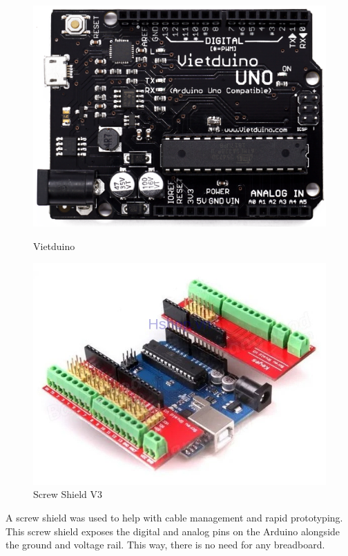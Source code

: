 \begin{figure}[h]
  \centering
  \begin{minipage}[b]{0.4\textwidth}
    \includegraphics[width=\textwidth]{070_design/sensors/45_vietduino.png}
    \caption{Vietduino \cite{vietduino}}
  \end{minipage}
  \hfill
  \begin{minipage}[b]{0.5\textwidth}
    \includegraphics[width=\textwidth]{070_design/sensors/46_screwshield.jpeg}
    \caption{Screw Shield V3 \cite{screwshield}}
  \end{minipage}
\end{figure}

A screw shield was used to help with cable management and rapid prototyping. This screw shield exposes the digital and analog pins on the Arduino alongside the ground and voltage rail. This way, there is no need for any breadboard.

